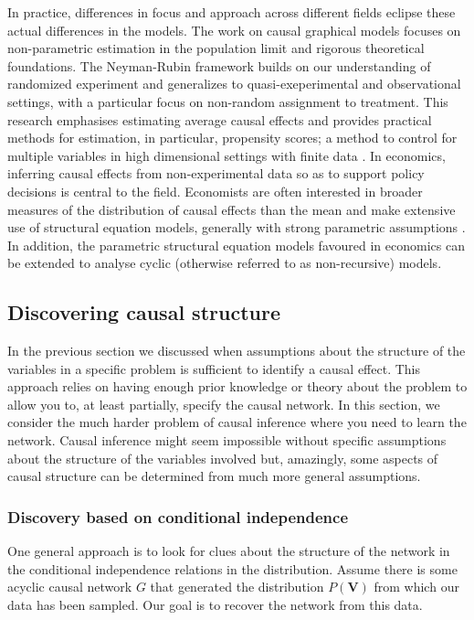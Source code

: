 \documentclass[11pt,a4paper]{article}
\begin{document}
In practice, differences in focus and approach across different fields eclipse these actual differences in the models. The work on causal graphical models \cite{Pearl2000,Sprites} focuses on non-parametric estimation in the population limit and rigorous theoretical foundations. The Neyman-Rubin framework builds on our understanding of randomized experiment and generalizes to quasi-exeperimental and observational settings, with a particular focus on non-random assignment to treatment. This research emphasises estimating average causal effects and provides practical methods for estimation, in particular, propensity scores; a method to control for multiple variables in high dimensional settings with finite data \cite{Rosenbaum1983}. In economics, inferring causal effects from non-experimental data so as to support policy decisions is central to the field. Economists are often interested in broader measures of the distribution of causal effects than the mean and make extensive use of structural equation models, generally with strong parametric assumptions \cite{Heckman2008}. In addition, the parametric structural equation models favoured in economics can be extended to analyse cyclic (otherwise referred to as non-recursive) models. 


\subsection{Discovering causal structure}

In the previous section we discussed when assumptions about the structure of the variables in a specific problem is sufficient to identify a causal effect. This approach relies on having enough prior knowledge or theory about the problem to allow you to, at least partially, specify the causal network. In this section, we consider the much harder problem of causal inference where you need to learn the network. Causal inference might seem impossible without specific assumptions about the structure of the variables involved but, amazingly, some aspects of causal structure can be determined from much more general assumptions.  

 
\subsubsection{Discovery based on conditional independence}
One general approach is to look for clues about the structure of the network in the conditional independence relations in the distribution. Assume there is some acyclic causal network $G$ that generated the distribution $P(\boldsymbol{V})$ from which our data has been sampled. Our goal is to recover the network from this data. 
\end{document}

